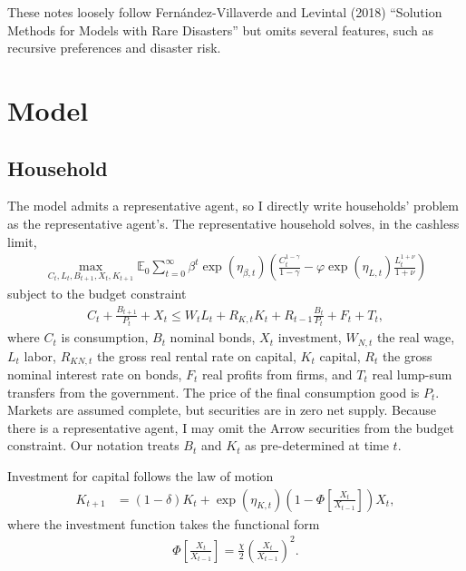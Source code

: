 \documentclass[12 pt, oneside]{article}
\theoremstyle{definition}
\theoremstyle{definition}
\theoremstyle{definition}
\newcommand{\E}{\mathbb{E}}
\begin{document}
These notes loosely follow Fern{\'a}ndez-Villaverde and Levintal (2018) ``Solution Methods for Models with Rare Disasters'' but omits several features, such as recursive preferences and disaster risk.

\section{Model}\label{sec:model}

\subsection{Household}

The model admits a representative agent, so I directly write households' problem as the representative agent's. The representative household solves, in the cashless limit,
\begin{align}\label{eq:hh objective}
  \max_{C_t, L_t, B_{t + 1}, X_t, K_{t + 1}} \E_0 \sum_{t = 0}^\infty \beta^t\exp(\eta_{\beta,t}) \left( \frac{C_t^{1 - \gamma}}{1 - \gamma} -  \varphi\exp(\eta_{L, t})\frac{L_t^{1 + \nu}}{1 + \nu}\right)
\end{align}
subject to the budget constraint
\begin{align}\label{eq:hh budget constraint}
  C_t + \frac{B_{t + 1}}{P_t} + X_t  \leq W_t L_t + R_{K, t} K_t + R_{t - 1} \frac{B_t}{P_t} + F_t + T_t,
\end{align}
where $C_t$ is consumption, $B_t$ nominal bonds, $X_t$ investment, $W_{N, t}$ the real wage, $L_t$ labor, $R_{KN, t}$ the gross real rental rate on capital,
$K_t$ capital, $R_t$ the gross nominal interest rate on bonds, $F_t$ real profits from firms, and $T_t$ real lump-sum transfers from the government.
The price of the final consumption good is $P_t$. Markets are assumed complete, but securities are in zero net supply. Because there is a representative agent, I may omit the Arrow securities from the budget constraint. Our notation treats
$B_t$ and $K_t$ as pre-determined at time $t$.

Investment for capital follows the law of motion
\begin{align}\label{eq:invst eqn}
  K_{t + 1} & = (1 - \delta) K_t + \exp(\eta_{K, t})\left(1 - \Phi\left[\frac{X_t}{X_{t - 1}}\right]\right)X_t,
\end{align}
where the investment function takes the functional form
\begin{align*}
  \Phi\left[\frac{X_t}{X_{t - 1}}\right] = \frac{\chi}{2}\left(\frac{X_t}{X_{t - 1}} \right)^2.
\end{align*}
\end{document}

